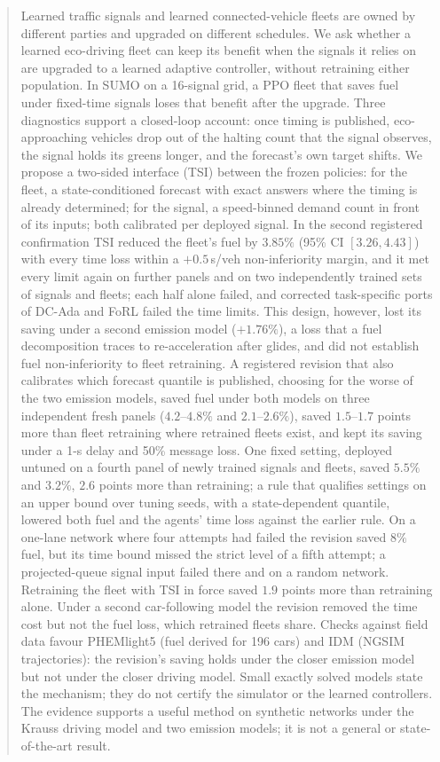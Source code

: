 \begin{abstract}
Learned traffic signals and learned connected-vehicle fleets are owned by different parties and upgraded on different schedules. We ask
whether a learned eco-driving fleet can keep its benefit when the signals it relies on are upgraded to a learned adaptive controller,
without retraining either population. In SUMO on a 16-signal grid, a PPO fleet that saves fuel under fixed-time signals loses that benefit
after the upgrade. Three diagnostics support a closed-loop account: once timing is published, eco-approaching vehicles drop out of the
halting count that the signal observes, the signal holds its greens longer, and the forecast's own target shifts. We propose a two-sided
interface (TSI) between the frozen policies: for the fleet, a state-conditioned forecast with exact answers where the timing is already
determined; for the signal, a speed-binned demand count in front of its inputs; both calibrated per deployed signal. In the second
registered confirmation TSI reduced the fleet's fuel by $3.85\%$ (95\% CI $[3.26, 4.43]$) with every time loss within a $+0.5$\,s/veh
non-inferiority margin, and it met every limit again on further panels and on two independently trained sets of signals and fleets; each
half alone failed, and corrected task-specific ports of DC-Ada and FoRL failed the time limits. This design, however, lost its saving under
a second emission model ($+1.76\%$), a loss that a fuel decomposition traces to re-acceleration after glides, and did not establish fuel
non-inferiority to fleet retraining. A registered revision that also calibrates which forecast quantile is published, choosing for the worse
of the two emission models, saved fuel under both models on three independent fresh panels ($4.2$--$4.8\%$ and $2.1$--$2.6\%$), saved
$1.5$--$1.7$ points more than fleet retraining where retrained fleets exist, and kept its saving under a 1-s delay and 50\% message loss.
One fixed setting, deployed untuned on a fourth panel of newly trained signals and fleets, saved $5.5\%$ and $3.2\%$, $2.6$ points more than
retraining; a rule that qualifies settings on an upper bound over tuning seeds, with a state-dependent quantile, lowered both fuel and the
agents' time loss against the earlier rule. On a one-lane network where four attempts had failed the revision saved $8\%$ fuel, but its time
bound missed the strict level of a fifth attempt; a projected-queue signal input failed there and on a random network. Retraining the fleet
with TSI in force saved $1.9$ points more than retraining alone. Under a second car-following model the revision removed the time cost but
not the fuel loss, which retrained fleets share. Checks against field data favour PHEMlight5 (fuel derived for 196 cars) and IDM (NGSIM
trajectories): the revision's saving holds under the closer emission model but not under the closer driving model. Small exactly solved
models state the mechanism; they do not certify the simulator or the learned controllers. The evidence supports a useful method on synthetic
networks under the Krauss driving model and two emission models; it is not a general or state-of-the-art result.
\end{abstract}

